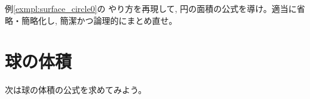 \begin{q}\label{q:int_circle0} 例\ref{exmpl:surface_circle0}の
やり方を再現して, 円の面積の公式を導け。適当に省略・簡略化し, 
簡潔かつ論理的にまとめ直せ。\end{q}

\section{球の体積}

次は球の体積の公式を求めてみよう。

